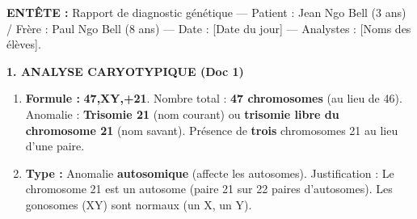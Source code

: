 \documentclass[11pt]{article}
\begin{document}
\begin{exoresolu}
\textbf{ENTÊTE :} Rapport de diagnostic génétique — Patient : Jean Ngo Bell (3 ans) / Frère : Paul Ngo Bell (8 ans) — Date : [Date du jour] — Analystes : [Noms des élèves].

\textbf{1. ANALYSE CARYOTYPIQUE (Doc 1)}
\begin{enumerate}
\item \textbf{Formule :} \textbf{47,XY,+21}. Nombre total : \textbf{47 chromosomes} (au lieu de 46). Anomalie : \textbf{Trisomie 21} (nom courant) ou \textbf{trisomie libre du chromosome 21} (nom savant). Présence de \textbf{trois} chromosomes 21 au lieu d'une paire.
\item \textbf{Type :} Anomalie \textbf{autosomique} (affecte les autosomes). Justification : Le chromosome 21 est un autosome (paire 21 sur 22 paires d'autosomes). Les gonosomes (XY) sont normaux (un X, un Y).
\end{enumerate}


\end{exoresolu}
\end{document}

